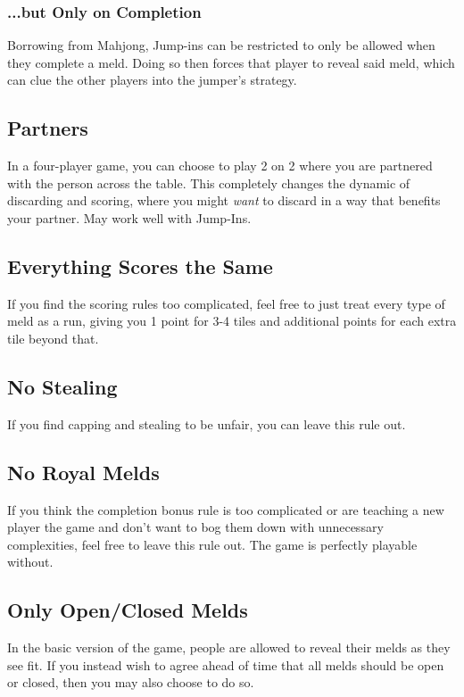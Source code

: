 \subsubsection{...but Only on Completion}
Borrowing from Mahjong, Jump-ins can be restricted to only be allowed when they complete a meld. Doing so then forces that player to reveal said meld, which can clue the other players into the jumper's strategy.

\subsection{Partners}
In a four-player game, you can choose to play 2 on 2 where you are partnered with the person across the table.
This completely changes the dynamic of discarding and scoring, where you might \textit{want} to discard in a way that benefits your partner. May work well with Jump-Ins.

\subsection{Everything Scores the Same}
If you find the scoring rules too complicated, feel free to just treat every type of meld as a run, giving you 1 point for 3-4 tiles and additional points for each extra tile beyond that.

\subsection{No Stealing}
If you find capping and stealing to be unfair, you can leave this rule out.

\subsection{No Royal Melds}
If you think the completion bonus rule is too complicated or are teaching a new player the game and don't want to bog them down with unnecessary complexities, feel free to leave this rule out.
The game is perfectly playable without.

\subsection{Only Open/Closed Melds}
In the basic version of the game, people are allowed to reveal their melds as they see fit.
If you instead wish to agree ahead of time that all melds should be open or closed, then you may also choose to do so.